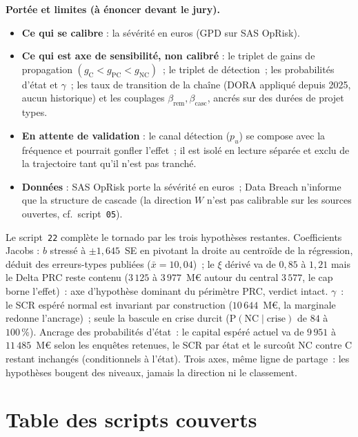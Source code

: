 \documentclass[11pt,a4paper]{article}
\begin{document}
\begin{portee}
\textbf{Portée et limites (à énoncer devant le jury).}
\begin{itemize}[leftmargin=1.4em,itemsep=1pt,topsep=2pt]
\item \textbf{Ce qui se calibre} : la sévérité en euros (GPD sur SAS OpRisk).
\item \textbf{Ce qui est axe de sensibilité, non calibré} : le triplet de gains de propagation
  $(g_{\text{C}}<g_{\text{PC}}<g_{\text{NC}})$~; le triplet de détection~; les probabilités
  d'état et $\gamma$~; les taux de transition de la chaîne (DORA appliqué depuis 2025, aucun
  historique) et les couplages $\beta_{\text{rem}},\beta_{\text{casc}}$, ancrés sur des durées
  de projet types.
\item \textbf{En attente de validation} : le canal détection ($p_u$) se compose avec la
  fréquence et pourrait gonfler l'effet~; il est isolé en lecture séparée et exclu de la
  trajectoire tant qu'il n'est pas tranché.
\item \textbf{Données} : SAS OpRisk porte la sévérité en euros~; Data Breach n'informe que la
  structure de cascade (la direction $W$ n'est pas calibrable sur les sources ouvertes,
  cf.~script~\texttt{05}).
\end{itemize}
\end{portee}

Le script~\texttt{22} complète le tornado par les trois hypothèses restantes. Coefficients
Jacobs : $b$ stressé à $\pm 1{,}645$~SE en pivotant la droite au centroïde de la régression,
déduit des erreurs-types publiées ($\bar{x} = 10{,}04$)~; le $\xi$ dérivé va de $0{,}85$ à
$1{,}21$ mais le Delta PRC reste contenu ($3\,125$ à $3\,977$~M\euro{} autour du central
$3\,577$, le cap borne l'effet)~: axe d'hypothèse dominant du périmètre PRC, verdict intact.
$\gamma$~: le SCR espéré normal est invariant par construction ($10\,644$~M\euro, la
marginale redonne l'ancrage)~; seule la bascule en crise durcit
($\mathrm{P}(\text{NC} \mid \text{crise})$ de $84$ à $100\,\%$). Ancrage des probabilités
d'état~: le capital espéré actuel va de $9\,951$ à $11\,485$~M\euro{} selon les enquêtes
retenues, le SCR par état et le surcoût NC contre C restant inchangés (conditionnels à
l'état). Trois axes, même ligne de partage~: les hypothèses bougent des niveaux, jamais la
direction ni le classement.

\section*{Table des scripts couverts}
\end{document}
